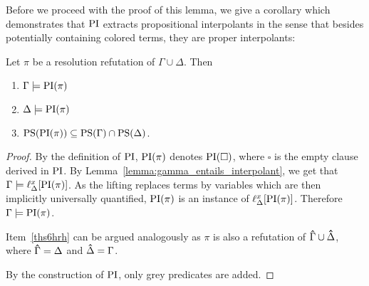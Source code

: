 Before we proceed with the proof of this lemma, we give a corollary which demonstrates that $\operatorname{PI}$ 
extracts propositional interpolants in the sense that besides potentially containing colored terms, they are proper interpolants:


\begin{cor}
	Let $\pi$ be a resolution refutation of $\Gamma \cup \Delta$.
	Then
	\begin{enumerate}
		\item$\Gamma\models \operatorname{PI}(\pi)$
		\item$\Delta\models \operatorname{PI}(\pi)$
			\label{ths6hrh}
		\item $\operatorname{PS}(\operatorname{PI}(\pi)) \subseteq \operatorname{PS}(\Gamma) \cap \operatorname{PS}(\Delta)$.
		\end{enumerate}
\end{cor}
\begin{proof}
	By the definition of $\operatorname{PI}$, 
	$\operatorname{PI}(\pi)$ denotes $\operatorname{PI}(\square)$, where $\square$ is the empty clause derived in $\operatorname{PI}$.
	By Lemma~\ref{lemma:gamma_entails_interpolant}, we get that 
	$ \Gamma \models \ell_{\Delta}^{x}[\operatorname{PI}(\pi)]$.
	As the lifting replaces terms by variables which are then implicitly universally quantified, $\operatorname{PI}(\pi)$ is an instance of $\ell_{\Delta}^{x}[\operatorname{PI}(\pi)]$.
	Therefore $\Gamma \models \operatorname{PI}(\pi)$.

	Item~\ref{ths6hrh} can be argued analogously as $\pi$ is also a refutation of $\bm\hat \Gamma \cup \bm\hat \Delta$, where $\bm\hat\Gamma = \Delta$ and $\bm\hat\Delta = \Gamma$.

	By the construction of $\operatorname{PI}$, only grey predicates are added.
\end{proof}

